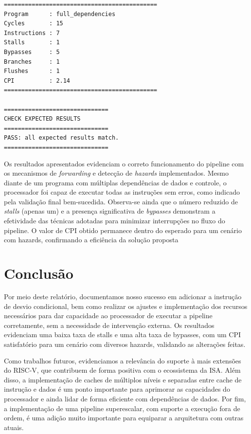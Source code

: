 \documentclass{sbc2023}%
\begin{document}
\begin{verbatim}
============================================
Program      : full_dependencies
Cycles       : 15
Instructions : 7
Stalls       : 1
Bypasses     : 5
Branches     : 1
Flushes      : 1
CPI          : 2.14
============================================

==============================
CHECK EXPECTED RESULTS
==============================
PASS: all expected results match.
==============================
\end{verbatim}

Os resultados apresentados evidenciam o correto funcionamento do pipeline com os mecanismos de \textit{forwarding} e detecção de \textit{hazards} implementados. Mesmo diante de um programa com múltiplas dependências de dados e controle, o processador foi capaz de executar todas as instruções sem erros, como indicado pela validação final bem-sucedida. Observa-se ainda que o número reduzido de \textit{stalls} (apenas um) e a presença significativa de \textit{bypasses} demonstram a efetividade das técnicas adotadas para minimizar interrupções no fluxo do pipeline. O valor de CPI obtido permanece dentro do esperado para um cenário com hazards, confirmando a eficiência da solução proposta

\section{Conclusão}

Por meio deste relatório, documentamos nosso sucesso em adicionar a instrução de desvio condicional, bem como realizar os ajustes e implementação dos recursos necessários para dar capacidade ao processador de executar a pipeline corretamente, sem a necessidade de intervenção externa. Os resultados evidenciam uma baixa taxa de stalls e uma alta taxa de bypasses, com um CPI satisfatório para um cenário com diversos hazards, validando as alterações feitas.

Como trabalhos futuros, evidenciamos a relevância do suporte à mais extensões do RISC-V, que contribuem de forma positiva com o ecossistema da ISA. Além disso, a implementação de caches de múltiplos níveis e separadas entre cache de instrução e dados é um ponto importante para aprimorar as capacidades do processador e ainda lidar de forma eficiente com dependências de dados. Por fim, a implementação de uma pipeline superescalar, com suporte a execução fora de ordem, é uma adição muito importante para equiparar a arquitetura com outras atuais.
\end{document}
